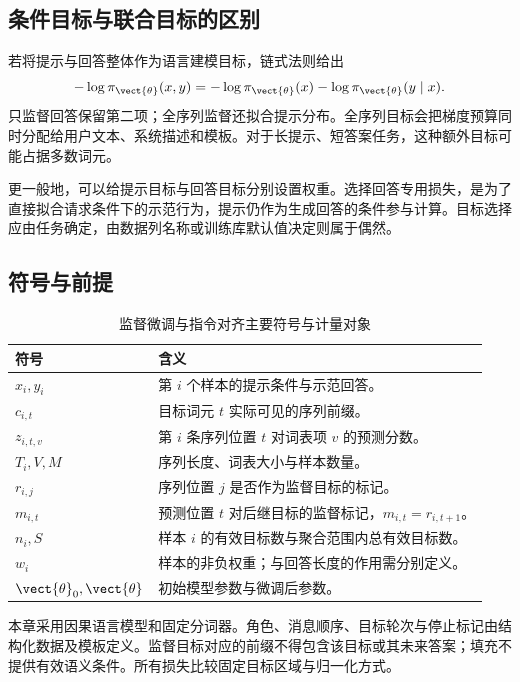 \documentclass[../textbook.tex]{subfiles}
\begin{document}
\subsection{条件目标与联合目标的区别}
若将提示与回答整体作为语言建模目标，链式法则给出
\begin{equation}
 -\log\pi_{\vect{\theta}}(x,y)=-\log\pi_{\vect{\theta}}(x)-\log\pi_{\vect{\theta}}(y\mid x).
 \label{eq:sft-joint}
\end{equation}
只监督回答保留第二项；全序列监督还拟合提示分布。全序列目标会把梯度预算同时分配给用户文本、系统描述和模板。对于长提示、短答案任务，这种额外目标可能占据多数词元。

更一般地，可以给提示目标与回答目标分别设置权重。选择回答专用损失，是为了直接拟合请求条件下的示范行为，提示仍作为生成回答的条件参与计算。目标选择应由任务确定，由数据列名称或训练库默认值决定则属于偶然。

\subsection{符号与前提}
\begin{table}[htbp]
\centering
\caption{监督微调与指令对齐主要符号与计量对象}
\label{tab:sft-symbols}
\begin{tabular}{ll}
\toprule 符号 & 含义\\\midrule
$x_i,y_i$ & 第 $i$ 个样本的提示条件与示范回答。\\
$c_{i,t}$ & 目标词元 $t$ 实际可见的序列前缀。\\
$z_{i,t,v}$ & 第 $i$ 条序列位置 $t$ 对词表项 $v$ 的预测分数。\\
$T_i,V,M$ & 序列长度、词表大小与样本数量。\\
$r_{i,j}$ & 序列位置 $j$ 是否作为监督目标的标记。\\
$m_{i,t}$ & 预测位置 $t$ 对后继目标的监督标记，$m_{i,t}=r_{i,t+1}$。\\
$n_i,S$ & 样本 $i$ 的有效目标数与聚合范围内总有效目标数。\\
$w_i$ & 样本的非负权重；与回答长度的作用需分别定义。\\
$\vect{\theta}_0,\vect{\theta}$ & 初始模型参数与微调后参数。\\
\bottomrule
\end{tabular}
\end{table}

\begin{assumption}[条件监督的共同前提]
本章采用因果语言模型和固定分词器。角色、消息顺序、目标轮次与停止标记由结构化数据及模板定义。监督目标对应的前缀不得包含该目标或其未来答案；填充不提供有效语义条件。所有损失比较固定目标区域与归一化方式。
\end{assumption}
\end{document}
